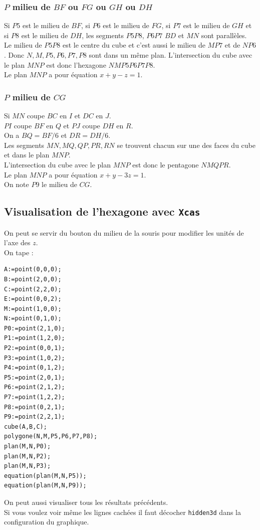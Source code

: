 \documentclass[a4paper,11pt]{book}
\begin{document}
\subsubsection{$P$ milieu de $BF$ ou $FG$ ou $GH$ ou $DH$}
Si $P5$ est le milieu de $BF$, si $P6$ est le milieu de $FG$, si $P7$ est le 
milieu de $GH$ et si $P8$ est le milieu de $DH$, les segments $P5P8$, $P6P7$
$BD$ et $MN$  sont parall\`eles. Le milieu de $P5P8$ est le centre du cube et 
c'est aussi le milieu de $MP7$ et de $NP6$. Donc $N,M,P5,P6,P7,P8$ sont dans 
un m\^eme plan.  
L'intersection du cube avec le plan $MNP$ est donc l'hexagone  $NMP5P6P7P8$.\\ 
Le plan $MNP$ a pour \'equation $x+y-z=1$.
\subsubsection{$P$ milieu de $CG$}
Si $MN$ coupe $BC$ en $I$ et $DC$ en $J$.\\
$PI$ coupe $BF$ en $Q$ et $PJ$ coupe $DH$ en $R$.\\
On a $BQ=BF/6$ et  $DR=DH/6$.\\
Les segments $MN,MQ,QP,PR,RN$ se trouvent chacun sur une des faces du 
cube et dans le plan $MNP$.\\
L'intersection du cube avec le plan $MNP$ est donc le pentagone $NMQPR$.\\ 
Le plan $MNP$ a pour \'equation $x+y-3z=1$.\\
On note $P9$ le milieu de $CG$.
\subsection{Visualisation de l'hexagone avec {\tt Xcas}}
On peut se servir du bouton du milieu de la souris pour modifier les unit\'es 
de l'axe des $z$.\\
On tape :
\begin{verbatim}
A:=point(0,0,0);
B:=point(2,0,0);
C:=point(2,2,0);
E:=point(0,0,2);
M:=point(1,0,0);
N:=point(0,1,0);
P0:=point(2,1,0);
P1:=point(1,2,0);
P2:=point(0,0,1);
P3:=point(1,0,2);
P4:=point(0,1,2);
P5:=point(2,0,1);
P6:=point(2,1,2);
P7:=point(1,2,2);
P8:=point(0,2,1);
P9:=point(2,2,1);
cube(A,B,C);
polygone(N,M,P5,P6,P7,P8);
plan(M,N,P0);
plan(M,N,P2);
plan(M,N,P3);
equation(plan(M,N,P5));
equation(plan(M,N,P9));
\end{verbatim}
On peut aussi visualiser tous les r\'esultats pr\'ec\'edents.\\
Si vous voulez voir m\^eme les lignes cach\'ees il faut d\'ecocher
{\tt hidden3d} dans la configuration du graphique.
\end{document}
